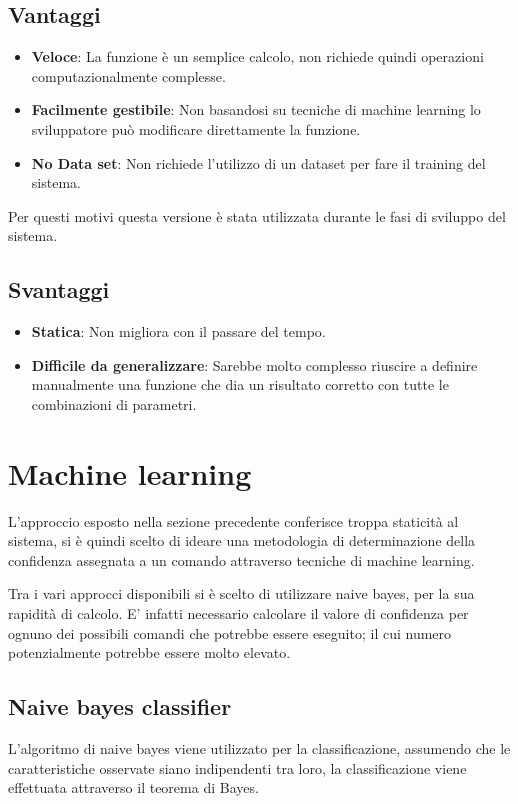 \documentclass[twoside]{supsistudent}
\begin{document}
\subsection{Vantaggi}
\begin{itemize}
  \item \textbf{Veloce}: La funzione è un semplice calcolo, non richiede quindi operazioni computazionalmente complesse.
   \item \textbf{Facilmente gestibile}: Non basandosi su tecniche di machine learning lo sviluppatore può modificare direttamente la funzione.
  \item \textbf{No Data set}: Non richiede l'utilizzo di un dataset per fare il training del sistema.
\end{itemize}
Per questi motivi questa versione è stata utilizzata durante le fasi di sviluppo del sistema.
\subsection{Svantaggi}
\begin{itemize}
  \item \textbf{Statica}: Non migliora con il passare del tempo.
   \item \textbf{Difficile da generalizzare}: Sarebbe molto complesso riuscire a definire manualmente una funzione che dia un risultato corretto con tutte le combinazioni di parametri.
\end{itemize}
\newpage

\section{Machine learning}
L'approccio esposto nella sezione precedente conferisce troppa staticità al sistema, si è quindi scelto di ideare una metodologia di determinazione della confidenza assegnata a un comando attraverso tecniche di machine learning.

Tra i vari approcci disponibili si è scelto di utilizzare naive bayes, per la sua rapidità di calcolo. E' infatti necessario calcolare il valore di confidenza per ognuno dei possibili comandi che potrebbe essere eseguito; il cui numero potenzialmente potrebbe essere molto elevato.
\subsection{Naive bayes classifier}
L'algoritmo di naive bayes viene utilizzato per la classificazione, assumendo che le caratteristiche osservate siano indipendenti tra loro, la classificazione viene effettuata attraverso il teorema di Bayes.
\end{document}
